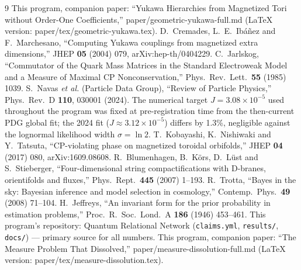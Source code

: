 \documentclass[aps,prd,preprint,nofootinbib]{revtex4-2}
\begin{document}
\begin{thebibliography}{9}
 This program, companion paper: ``Yukawa Hierarchies from Magnetized Tori without Order-One Coefficients,'' paper/geometric-yukawa-full.md (LaTeX version: paper/tex/geometric-yukawa.tex).
 D.~Cremades, L.~E.~Ib\'a\~nez and F.~Marchesano, ``Computing Yukawa couplings from magnetized extra dimensions,'' JHEP \textbf{05} (2004) 079, arXiv:hep-th/0404229.
 C.~Jarlskog, ``Commutator of the Quark Mass Matrices in the Standard Electroweak Model and a Measure of Maximal CP Nonconservation,'' Phys.\ Rev.\ Lett.\ \textbf{55} (1985) 1039.
 S.~Navas \emph{et al.} (Particle Data Group), ``Review of Particle Physics,'' Phys.\ Rev.\ D \textbf{110}, 030001 (2024). The numerical target $J=3.08\times 10^{-5}$ used throughout the program was fixed at pre-registration time from the then-current PDG global fit; the 2024 fit ($J\approx 3.12\times 10^{-5}$) differs by 1.3\%, negligible against the lognormal likelihood width $\sigma=\ln 2$.
 T.~Kobayashi, K.~Nishiwaki and Y.~Tatsuta, ``CP-violating phase on magnetized toroidal orbifolds,'' JHEP \textbf{04} (2017) 080, arXiv:1609.08608.
 R.~Blumenhagen, B.~K\"ors, D.~L\"ust and S.~Stieberger, ``Four-dimensional string compactifications with D-branes, orientifolds and fluxes,'' Phys.\ Rept.\ \textbf{445} (2007) 1--193.
 R.~Trotta, ``Bayes in the sky: Bayesian inference and model selection in cosmology,'' Contemp.\ Phys.\ \textbf{49} (2008) 71--104.
 H.~Jeffreys, ``An invariant form for the prior probability in estimation problems,'' Proc.\ R.\ Soc.\ Lond.\ A \textbf{186} (1946) 453--461.
 This program's repository: Quantum Relational Network (\texttt{claims.yml}, \texttt{results/}, \texttt{docs/}) --- primary source for all numbers.
 This program, companion paper: ``The Measure Problem That Dissolved,'' paper/measure-dissolution-full.md (LaTeX version: paper/tex/measure-dissolution.tex).
\end{thebibliography}
\end{document}
